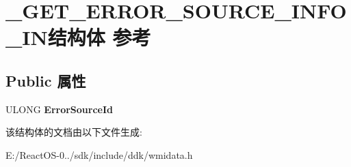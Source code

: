 \hypertarget{struct___g_e_t___e_r_r_o_r___s_o_u_r_c_e___i_n_f_o___i_n}{}\section{\+\_\+\+G\+E\+T\+\_\+\+E\+R\+R\+O\+R\+\_\+\+S\+O\+U\+R\+C\+E\+\_\+\+I\+N\+F\+O\+\_\+\+I\+N结构体 参考}
\label{struct___g_e_t___e_r_r_o_r___s_o_u_r_c_e___i_n_f_o___i_n}
\subsection*{Public 属性}
\begin{DoxyCompactItemize}
\item 
\mbox{\label{struct___g_e_t___e_r_r_o_r___s_o_u_r_c_e___i_n_f_o___i_n_ad326773c9f4edfdd0cdfa46e6b5242b9}} 
U\+L\+O\+NG {\bfseries Error\+Source\+Id}
\end{DoxyCompactItemize}


该结构体的文档由以下文件生成\+:\begin{DoxyCompactItemize}
\item 
E\+:/\+React\+O\+S-\/0../sdk/include/ddk/wmidata.\+h\end{DoxyCompactItemize}
